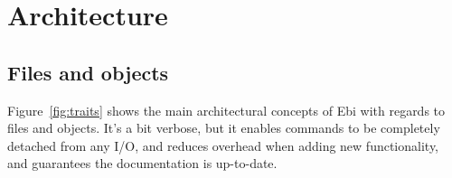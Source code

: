 \documentclass{article}
\begin{document}
    \ebifilehandlers

\clearpage
\section{Architecture}
\label{sec:architecture}

    \subsection{Files and objects}
        Figure~\ref{fig:traits} shows the main architectural concepts of Ebi with regards to files and objects.
        It's a bit verbose, but it enables commands to be completely detached from any I/O, and reduces overhead when adding new functionality, and guarantees the documentation is up-to-date.
    
\end{document}
